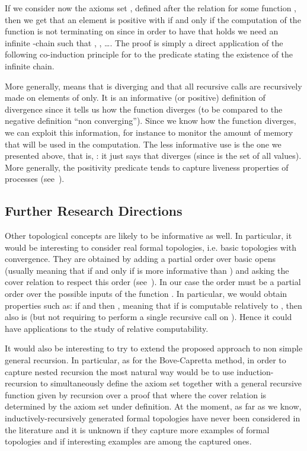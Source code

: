 \documentclass[copyright,creativecommons]{eptcs}
\begin{document}
If we consider now the axioms set , defined after the relation 
for some function , then we get that an element  is positive with  if and only if
the computation of the function  is not terminating on  since in order to have that 
holds we need an infinite -chain 
such that , , \ldots. 
The proof is simply a direct application of the following co-induction principle for
 to the predicate  stating the existence of the infinite chain.


More generally,  means that  is
diverging and that all recursive calls are recursively made on elements of 
only. 
It is an informative (or positive) definition of divergence since it tells
us how the function diverges (to be compared to the
negative definition ``non converging''). 
Since we know how the function diverges, we can exploit this information, for 
instance to monitor the amount of memory that will be used in the computation. 
The less informative use is the one we presented above, that is, : 
it just says that  diverges (since  is the set of all values).
More generally, the positivity predicate tends to capture liveness properties of 
processes (see~\cite{HH06}).




\subsection{Further Research Directions}

Other topological concepts are likely to be informative as well. 
In particular, it would
be interesting to consider real formal topologies, i.e. basic topologies with
convergence. They are obtained by adding a partial order  over basic opens
(usually meaning that  if and only if  is more informative than ) and
asking the cover relation to respect this order (see~\cite{TIG}). In our case
the order must be a partial order over the possible inputs of the function .
In particular, we would obtain properties such as: if  and
 then , meaning that if  is
computable relatively to , then  also is (but not requiring  to
perform a single recursive call on ). Hence it could have applications to
the study of relative computability.

It would also be interesting to try to extend the proposed approach to non simple
general recursion. In particular, as for the Bove-Capretta method, in order
to capture nested recursion the most natural way would be to use
induction-recursion to simultaneously define the axiom set together with a
general recursive function given by recursion over a proof that
 where the cover relation is determined by the axiom set
under definition. At the moment, as far as we know,
inductively-recursively generated formal topologies have never been considered in
the literature and it is unknown if they capture more examples of formal
topologies and if interesting examples are among the captured ones.
\end{document}

